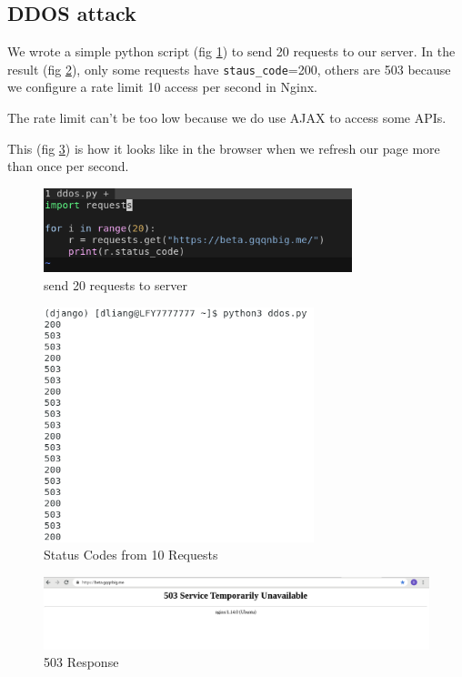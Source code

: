 \documentclass[12pt, a4paper]{article}
\newcommand{\code}[1]{\texttt{#1}}
\begin{document}
\subsection{DDOS attack}
We wrote a simple python script (fig \ref{fig:ddos}) to send 20 requests to our server. In the result (fig \ref{fig:ddos-out}), only some requests have \code{staus\_code}=200, others are 503 because we configure a rate limit 10 access per second in Nginx. 

The rate limit can't be too low because we do use AJAX to access some APIs.

This (fig \ref{fig:503}) is how it looks like in the browser when we refresh our page more than once per second.



\begin{figure}[ht]
\centering
\includegraphics[width=0.8\textwidth]{ddos.png}
\caption{send 20 requests to server}
\label{fig:ddos}
\end{figure}

\begin{figure}[ht]
\centering
\includegraphics[width=0.7\textwidth]{ddos-out.png}
\caption{Status Codes from 10 Requests}
\label{fig:ddos-out}
\end{figure}

\begin{figure}[ht]
\centering
\includegraphics[width=\textwidth]{503.png}
\caption{503 Response}
\label{fig:503}
\end{figure}
\end{document}
